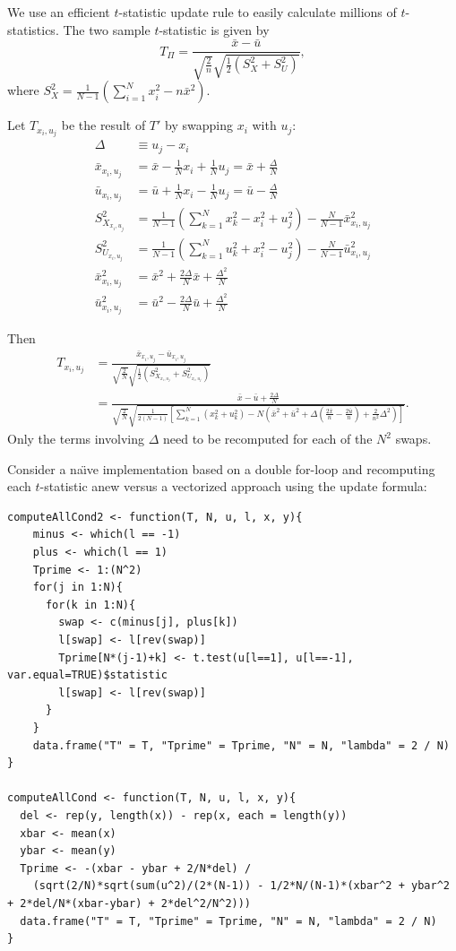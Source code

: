 We use an efficient $t$-statistic update rule to easily calculate
millions of $t$-statistics.  The two sample $t$-statistic is given by
\begin{equation*}
  T_{\Pi} = \frac{\bar{x}-\bar{u}}
  {\sqrt{\frac{2}{n}}\sqrt{\frac{1}{2}(S_X^2+S_U^2)}},
\end{equation*}
where $S_X^2=\frac{1}{N-1}(\sum_{i=1}^Nx_i^2-n\bar{x}^2)$.

Let $T_{x_i,u_j}$ be the result of $T'$ by swapping $x_i$ with $u_j$:
\begin{align*}
  \Delta &\equiv u_j-x_i \\
  \bar{x}_{x_i,u_j} &= \bar{x}-\frac{1}{N}x_i+\frac{1}{N}u_j =
  \bar{x}+\frac{\Delta}{N} \\
  \bar{u}_{x_i,u_j} &= \bar{u}+\frac{1}{N}x_i-\frac{1}{N}u_j =
  \bar{u}-\frac{\Delta}{N} \\
  S_{X_{x_i,u_j}}^2 &= \frac{1}{N-1}(\sum_{k=1}^N x_k^2 - x_i^2 +
  u_j^2) - \frac{N}{N-1}\bar{x}^2_{x_i,u_j} \\
  S_{U_{x_i,u_j}}^2 &= \frac{1}{N-1}(\sum_{k=1}^N u_k^2 + x_i^2 -
  u_j^2) - \frac{N}{N-1}\bar{u}^2_{x_i,u_j} \\
  \bar{x}_{x_i,u_j}^2 &= \bar{x}^2 + \frac{2\Delta}{N}\bar{x} +
  \frac{\Delta^2}{N} \\
  \bar{u}_{x_i,u_j}^2 &= \bar{u}^2 - \frac{2\Delta}{N}\bar{u} + \frac{\Delta^2}{N}
\end{align*}

Then
\begin{align*}
  T_{x_i,u_j} &= \frac{\bar{x}_{x_i,u_j}-\bar{u}_{x_i,u_j}}
  {\sqrt{\frac{2}{N}}\sqrt{\frac{1}{2}(S_{X_{x_i,u_j}}^2+S_{U_{x_i,u_j}}^2)}}\\
  &= \frac{\bar{x}-\bar{u}+\frac{2\Delta}{N}}
  {\sqrt{\frac{2}{N}}\sqrt{\frac{1}{2(N-1)}[\sum_{k=1}^N (x_k^2+u_k^2)
      -N(\bar{x}^2+\bar{u}^2+\Delta(\frac{2\bar{x}}{n}
      -\frac{2\bar{u}}{n})+\frac{2}{n^2}\Delta^2)]}}.
\end{align*}
Only the terms involving $\Delta$ need to be recomputed for each of the $N^2$ swaps.

Consider a na\"{\i}ve implementation based on a double for-loop and recomputing each $t$-statistic
anew versus a vectorized approach using the update formula:
\begin{verbatim}
computeAllCond2 <- function(T, N, u, l, x, y){
    minus <- which(l == -1)
    plus <- which(l == 1)
    Tprime <- 1:(N^2)
    for(j in 1:N){
      for(k in 1:N){
        swap <- c(minus[j], plus[k])
        l[swap] <- l[rev(swap)]
        Tprime[N*(j-1)+k] <- t.test(u[l==1], u[l==-1], var.equal=TRUE)$statistic
        l[swap] <- l[rev(swap)]
      }
    }
    data.frame("T" = T, "Tprime" = Tprime, "N" = N, "lambda" = 2 / N)
}

computeAllCond <- function(T, N, u, l, x, y){
  del <- rep(y, length(x)) - rep(x, each = length(y))
  xbar <- mean(x)
  ybar <- mean(y)
  Tprime <- -(xbar - ybar + 2/N*del) /
    (sqrt(2/N)*sqrt(sum(u^2)/(2*(N-1)) - 1/2*N/(N-1)*(xbar^2 + ybar^2 + 2*del/N*(xbar-ybar) + 2*del^2/N^2)))
  data.frame("T" = T, "Tprime" = Tprime, "N" = N, "lambda" = 2 / N)
}
\end{verbatim}

